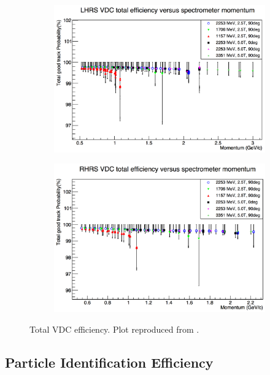 \begin{figure}[tb!]
  \centering
  \begin{subfigure}[t]{0.49\textwidth}
    \includegraphics[width=\textwidth]{figs/VDC-efficiency-left.png}
  \end{subfigure}
  \begin{subfigure}[t]{0.49\textwidth}
    \includegraphics[width=\textwidth]{figs/VDC-efficiency-right.png}
  \end{subfigure}
  \caption[Total VDC efficiency.]{Total VDC efficiency. Plot reproduced from \cite{Liu2013}. \label{C7S2F2}}
\end{figure}

\subsection{Particle Identification Efficiency}
\label{C7S2SS2}

